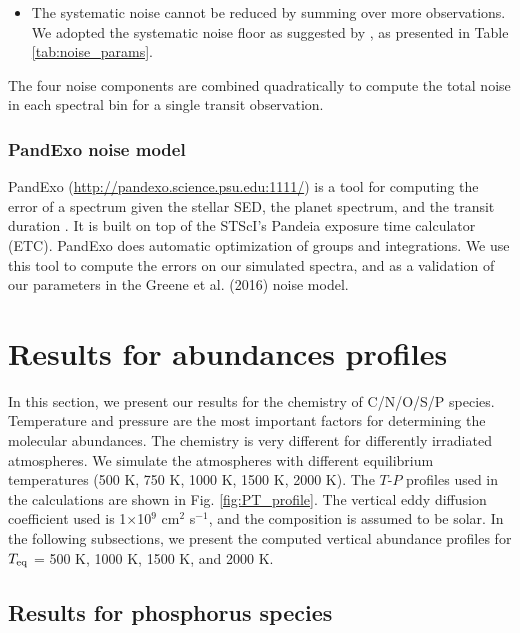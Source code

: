 \documentclass[twocolumn]{aastex61}
\begin{document}
\begin{itemize}
\item The systematic noise cannot be reduced by summing over more observations. We adopted the systematic noise floor as suggested by \citet{Greene16}, as presented in Table \ref{tab:noise_params}. 

\end{itemize}
The four noise components are combined quadratically to compute the total noise in each spectral bin for a single transit observation. 

\subsubsection{PandExo noise model}
PandExo (\url{http://pandexo.science.psu.edu:1111/}) is a tool for computing the error of a spectrum given the stellar SED, the planet spectrum, and the transit duration \citep{Batalha17}. It is built on top of the STScI's Pandeia exposure time calculator (ETC). PandExo does automatic optimization of groups and integrations. We use this tool to compute the errors on our simulated spectra, and as a validation of our parameters in the Greene et al. (2016) noise model. 

\section{Results for abundances profiles}\label{sec:abundances}

In this section, we present our results for the chemistry of C/N/O/S/P species. Temperature and pressure are the most important factors for determining the molecular abundances. The chemistry is very different for differently irradiated atmospheres. We simulate the atmospheres with different equilibrium temperatures (500 K, 750 K, 1000 K, 1500 K, 2000 K). The $T$-$P$ profiles used in the calculations are shown in Fig. \ref{fig:PT_profile}. The vertical eddy diffusion coefficient used is 1$\times$10$^9$ cm$^2$ s$^{-1}$, and the composition is assumed to be solar. In the following subsections, we present the computed vertical abundance profiles for $T_{\rm eq}$ = 500 K, 1000 K, 1500 K, and 2000 K. 
 
\subsection{Results for phosphorus species}\label{subsec:P_results}
\end{document}
